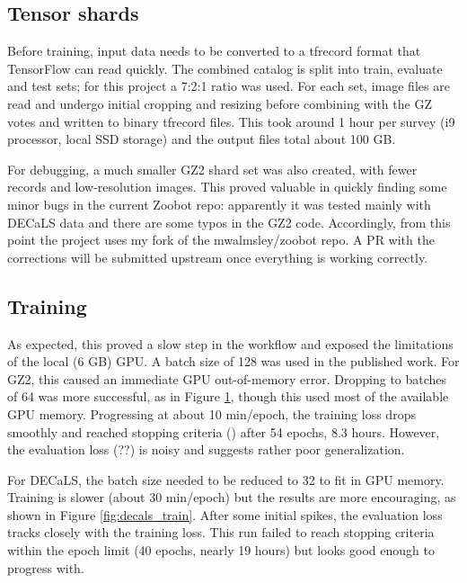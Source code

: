 \documentclass[twocolumn, twocolappendix, tighten]{aastex631}
\newcommand{\todo}{\color{red}{TODO}\color{black}\hspace{2mm}}
\begin{document}
\subsection{Tensor shards}

Before training, input data needs to be converted to a tfrecord format that TensorFlow can read quickly. The combined catalog is split into train, evaluate and test sets; for this project a 7:2:1 ratio was used. For each set, image files are read and undergo initial cropping and resizing before combining with the GZ votes and written to binary tfrecord files. This took around 1 hour per survey (i9 processor, local SSD storage) and the output files total about 100 GB.

For debugging, a much smaller GZ2 shard set was also created, with fewer records and low-resolution images. This proved valuable in quickly finding some minor bugs in the current Zoobot repo: apparently it was tested mainly with DECaLS data and there are some typos in the GZ2 code. Accordingly, from this point the project uses my fork of the mwalmsley/zoobot repo. A PR with the corrections will be submitted upstream once everything is working correctly.

\subsection{Training}

As expected, this proved a slow step in the workflow and exposed the limitations of the local (6 GB) GPU. A batch size of 128 was used in the published work. For GZ2, this caused an immediate GPU out-of-memory error. Dropping to batches of 64 was more successful, as in Figure \ref{fig:gz2_train_64}, though this used most of the available GPU memory. Progressing at about 10 min/epoch, the training loss drops smoothly and reached stopping criteria (\todo) after 54 epochs, 8.3 hours. However, the evaluation loss (??) is noisy and suggests rather poor generalization.

\begin{figure}[htb!]
	\caption{
		\label{fig:gz2_train_64}}
\end{figure}

For DECaLS, the batch size needed to be reduced to 32 to fit in GPU memory. Training is slower (about 30 min/epoch) but the results are more encouraging, as shown in Figure \ref{fig:decals_train}. After some initial spikes, the evaluation loss tracks closely with the training loss. This run failed to reach stopping criteria within the epoch limit (40 epochs, nearly 19 hours) but looks good enough to progress with.
\end{document}
